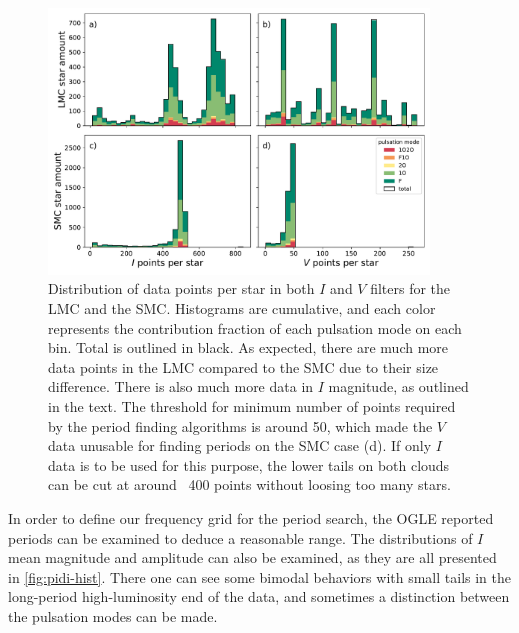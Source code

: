 \begin{figure}
	\centering
	\includegraphics[width=0.9\textwidth]{img/clouds_histogram_ns.pdf}
	\caption[Distribution of data size for classical Cepheids in the Magellanic clouds]{
		Distribution of data points per star in both $I$ and $V$ filters for the LMC and the SMC. 
		Histograms are cumulative, and each color represents the contribution fraction of each pulsation mode on each bin.
		Total is outlined in black.
		As expected, there are much more data points in the LMC compared to the SMC due to their size difference.
		There is also much more data in $I$ magnitude, as outlined in the text.
		The threshold for minimum number of points required by the period finding algorithms is around 50,
		which made the $V$ data unusable for finding periods on the SMC case (d).
		If only $I$ data is to be used for this purpose, 
		the lower tails on both clouds can be cut at around ~400 points without loosing too many stars.
	}
	\label{fig:n-hist}
\end{figure}



In order to define our frequency grid for the period search, the OGLE reported periods can be examined to deduce a reasonable range.
The distributions of $I$ mean magnitude and amplitude can also be examined, as they are all presented in \autoref{fig:pidi-hist}.
There one can see some bimodal behaviors with small tails in the long-period high-luminosity end of the data, 
and sometimes a distinction between the pulsation modes can be made.

